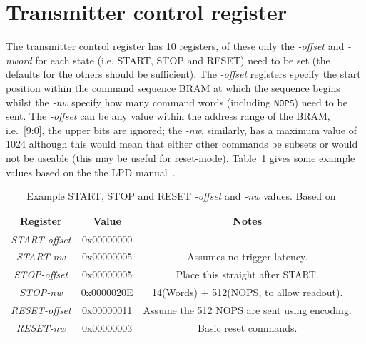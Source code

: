 \section{Transmitter control register} %
\label{sub:basic_transmitter_control_register}
The transmitter control register has 10 registers, of these only the \emph{-offset} and \emph{-nword} for each state (i.e. START, STOP and RESET) need to be set (the defaults for the others should be sufficient). The \emph{-offset} registers specify the start position within the command sequence BRAM at which the sequence begins whilst the \emph{-nw} specify how many command words (including \texttt{NOPS}) need to be sent. The \emph{-offset} can be any value within the address range of the BRAM, i.e.\ [9:0], the upper bits are ignored; the \emph{-nw}, similarly, has a maximum value of 1024 although this would mean that either other commands be subsets or would not be useable (this may be useful for reset-mode). Table~\ref{tab:basic_tx_control_reg} gives some example values based on the the LPD manual~\cite{lpd_manual}.
    
\begin{table}
    \begin{center}
        \begin{tabular}{c | c | c}
            Register            & Value      & Notes                                       \\
            \hline
            \emph{START-offset} & 0x00000000 &                                             \\
            \emph{START-nw} & 0x00000005 & Assumes no trigger latency.                 \\
            \emph{STOP-offset}  & 0x00000005 & Place this straight after START.            \\
            \emph{STOP-nw}  & 0x0000020E & 14(Words) + 512(NOPS, to allow readout).    \\
            \emph{RESET-offset} & 0x00000011 & Assume the 512 NOPS are sent using encoding.\\
            \emph{RESET-nw} & 0x00000003 & Basic reset commands.                       \\
        \end{tabular}
    \end{center}
    \caption{Example START, STOP and RESET \emph{-offset} and \emph{-nw} values. Based on \cite{lpd_manual}}
    \label{tab:basic_tx_control_reg}
\end{table}

